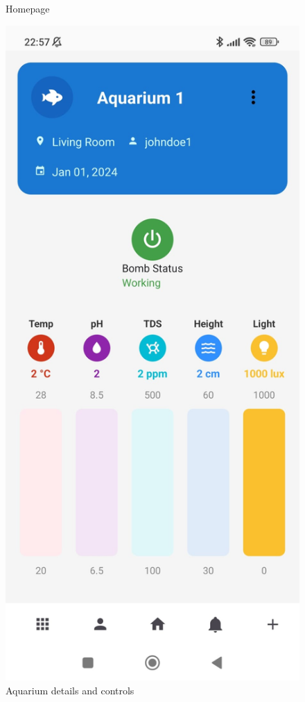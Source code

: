 \documentclass[11pt,a4paper]{article}
\begin{document}
\begin{figure}[H]
\begin{minipage}{0.35\textwidth}
        \caption*{Homepage}
    \end{minipage}
    \hfill
    \begin{minipage}{0.35\textwidth}
        \centering
        \includegraphics[width=\linewidth]{Images/Aquarium State.jpeg}
        \caption*{Aquarium details and controls}
    \end{minipage}
\end{figure}
\end{document}
